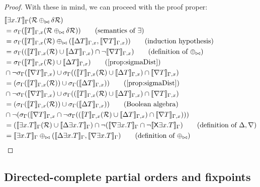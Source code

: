 \begin{proof}
  With these in mind, we can proceed with the proof proper:
  \begin{align*}
    &\sem{\exists x . T}_\Gamma(\semR \twist \diffR)\\
    &=\sigma_\Gamma(\sem{T}_{\Gamma, x}(\semR \twist \diffR)) \tag{semantics of $\exists$}\\
    &=\sigma_\Gamma(\sem{T}_{\Gamma, x}(\semR) \twist (\upsem{T}_{\Gamma, x}, \downsem{T}_{\Gamma, x})) \tag{induction hypothesis}\\
    &=\sigma_\Gamma((\sem{T}_{\Gamma, x}(\semR) \cup \upsem{T}_{\Gamma, x}) \cap \neg \downsem{T}_{\Gamma, x}) \tag{definition of $\twist$}\\
    &=\sigma_\Gamma(\sem{T}_{\Gamma, x}(\semR) \cup \upsem{T}_{\Gamma, x}) \tag{\cref{prop:sigmaDist}}\\
    &  \cap \neg \sigma_\Gamma(\downsem{T}_{\Gamma, x})
      \cup \sigma_\Gamma((\sem{T}_{\Gamma, x}(\semR) \cup \upsem{T}_{\Gamma, x}) \cap \downsem{T}_{\Gamma, x})\\
    &=(\sigma_\Gamma(\sem{T}_{\Gamma, x}(\semR)) \cup \sigma_\Gamma(\upsem{T}_{\Gamma, x})) \tag{\cref{prop:sigmaDist}}\\
    &\cap \neg \sigma_\Gamma(\downsem{T}_{\Gamma, x})
      \cup \sigma_\Gamma((\sem{T}_{\Gamma, x}(\semR) \cup \upsem{T}_{\Gamma, x}) \cap \downsem{T}_{\Gamma, x})
      \\
    &=(\sigma_\Gamma(\sem{T}_{\Gamma, x}(\semR)) \cup \sigma_\Gamma(\upsem{T}_{\Gamma, x})) \tag{Boolean algebra}\\
    & \cap \neg 
      (\sigma_\Gamma(\downsem{T}_{\Gamma, x} \cap \neg \sigma_\Gamma((\sem{T}_{\Gamma, x}(\semR) \cup \upsem{T}_{\Gamma, x}) \cap \downsem{T}_{\Gamma, x})))
    \\
    &=(\sem{\exists x . T}_{\Gamma}(\semR) \cup \upsem{\exists x . T}_{\Gamma})
      \cap \neg 
      (\downsem{\exists x . T}_{\Gamma} \cap \neg \bothsem{\exists x . T}_\Gamma) \tag{definition of $\updiff{}, \downdiff{}$}\\
    &= \sem{\exists x . T}_\Gamma \twist (\upsem{\exists x . T}_\Gamma, \downsem{\exists x . T}_\Gamma) \tag{definition of $\twist$}
  \end{align*}

\end{proof}

\subsection{Directed-complete partial orders and fixpoints}


